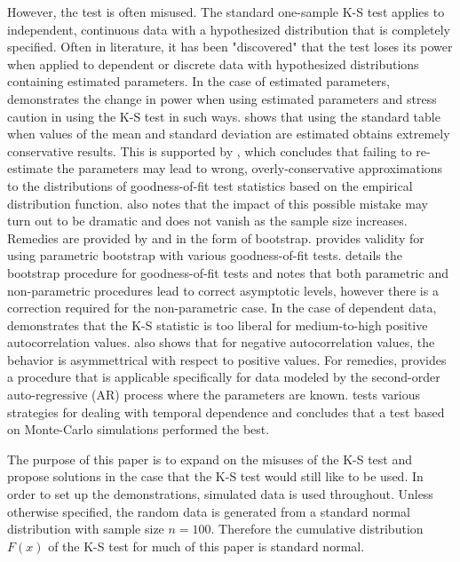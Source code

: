 \documentclass[12pt, letterpaper, titlepage]{article}
\begin{document}
However, the test is often misused. The standard one-sample K-S test applies to 
independent, continuous data with a hypothesized distribution that is completely specified. 
Often in literature, it has been "discovered" that the test loses its power when 
applied to dependent or discrete data with hypothesized distributions containing 
estimated parameters. In the case of estimated parameters, \citet{Steinskog} 
demonstrates the change in power when using estimated parameters and stress caution in 
using the K-S test in such ways. \citet{Lilliefors} shows 
that using the standard table when values of the mean and standard deviation are 
estimated obtains extremely conservative results. This is supported by \citet{Capasso}, which 
concludes that failing to re-estimate the parameters may lead to wrong, overly-conservative 
approximations to the distributions of goodness-of-fit test statistics based on the empirical 
distribution function. \citet{Capasso} also notes that the impact of this possible mistake 
may turn out to be dramatic and does not vanish as the sample size increases. Remedies are provided 
by \citet{Genest} and \citet{Babu} in the form of bootstrap. \citet{Genest} provides validity 
for using parametric bootstrap with various goodness-of-fit tests. \citet{Babu} details 
the bootstrap procedure for goodness-of-fit tests and notes that both parametric and 
non-parametric procedures lead to correct asymptotic levels, however there is a correction 
required for the non-parametric case. In the case of dependent data, \citet{Durilleul} demonstrates 
that the K-S statistic is too liberal for medium-to-high positive autocorrelation values. 
\citet{Durilleul} also shows that for negative autocorrelation values, the behavior is 
asymmettrical with respect to positive values. For remedies, \citet{Weiss} provides a 
procedure that is applicable specifically for data modeled by the second-order auto-regressive (AR) process 
where the parameters are known. \citet{Lanzante} tests various strategies for dealing with temporal dependence
and concludes that a test based on Monte-Carlo simulations performed the best.

The purpose of this paper is to expand on the misuses of the K-S test and propose 
solutions in the case that the K-S test would still like to be used. In order to set 
up the demonstrations, simulated data is used throughout. Unless otherwise specified, 
the random data is generated from a standard normal distribution with sample size $n = 100$. 
Therefore the cumulative distribution $F(x)$ of the K-S test for much of this paper is standard normal.
\end{document}

